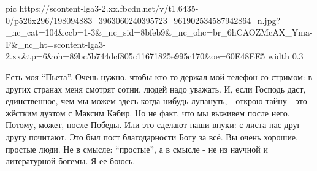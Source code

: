\ifcmt
  pic https://scontent-lga3-2.xx.fbcdn.net/v/t1.6435-0/p526x296/198094883_3963060240395723_961902534587942864_n.jpg?_nc_cat=104&ccb=1-3&_nc_sid=8bfeb9&_nc_ohc=br_6hCAOZMcAX_Yma-F&_nc_ht=scontent-lga3-2.xx&tp=6&oh=89bc5b744dcf805c11671825e995c170&oe=60E48EE5
	width 0.3
\fi

Есть моя \enquote{Пьета}. Очень нужно, чтобы кто-то держал мой телефон со стримом: в
других странах меня смотрят сотни, людей надо уважать. И, если Господь даст,
единственное, чем мы можем здесь когда-нибудь лупануть, - открою тайну - это
жёстким дуэтом с Максим Кабир. Но не факт, что мы выживем после него. Потому,
может, после Победы. Или это сделают наши внуки: с листа нас друг другу
почитают.  Это был пост благодарности Богу за всё. Вы очень хорошие, простые
люди. Не в смысле: \enquote{простые}, а в смысле - не из научной и  литературной
богемы. Я ее боюсь.

